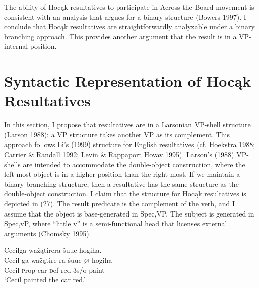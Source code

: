 \documentclass[output=paper]{LSP/langsci}
\begin{document}
The ability of Hoc\k{a}k resultatives to participate in Across the Board movement is consistent with an analysis that argues for a binary structure (Bowers 1997). I conclude that Hoc\k{a}k resultatives are straightforwardly analyzable under a binary branching approach. This provides another argument that the result is in a VP-internal position.
 
\section{Syntactic Representation of Hoc\k{a}k Resultatives}
 
In this section, I propose that resultatives are in a Larsonian VP-shell structure (Larson 1988): a VP structure takes another VP as its complement. This approach follows Li's (1999) structure for English resultatives (cf. Hoekstra 1988; Carrier \& Randall 1992; Levin \& Rappaport Hovav 1995). Larson's (1988) VP-shells are intended to accommodate the double-object construction, where the left-most object is in a higher position than the right-most. If we maintain a binary branching structure, then a resultative has the same structure as the double-object construction. I claim that the structure for Hoc\k{a}k resultatives is depicted in (27). The result predicate is the complement of the verb, and I assume that the object is base-generated in Spec,VP. The subject is generated in Spec,vP, where ``little v'' is a semi-functional head that licenses external arguments (Chomsky 1995).

\begin{exe}
\ex
\begin{xlist}

\ex \glll Cecilga wa\v{z}\k{a}tirera \v{s}uuc hogiha. \\
Cecil-ga  wa\v{z}\k{a}tire-ra \v{s}uuc $\varnothing$-hogiha \\
Cecil-{\textsc prop} car-{\textsc def} red {\textsc 3s/o}-paint\\
\glt `Cecil painted the car red.'

\ex 
{\hspace{1em}}\newline
{}
\end{xlist}
\end{exe}
\end{document}
